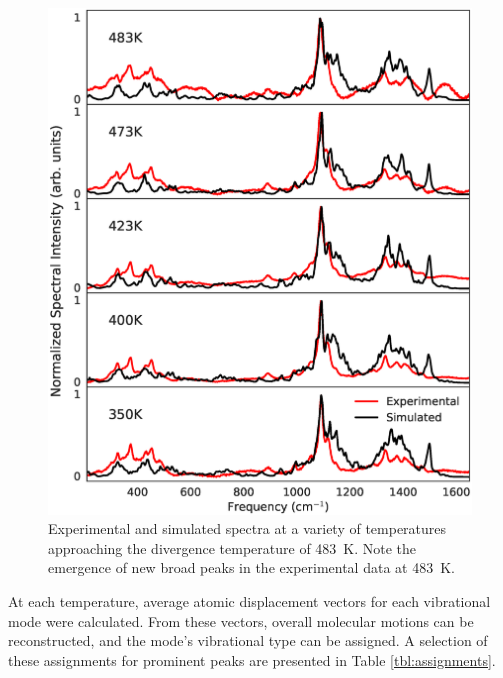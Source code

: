 \begin{figure}
\centering
\includegraphics[width=\linewidth]{money_graph_poster}
\caption{Experimental and simulated spectra at a variety of temperatures approaching the divergence temperature of \SI{483}{K}. Note the emergence of new broad peaks in the experimental data at \SI{483}{K}.}
\label{fig:money_graph_poster}
\end{figure}

At each temperature, average atomic displacement vectors for each vibrational mode were calculated. From these vectors, overall molecular motions can be reconstructed, and the mode's vibrational type can be assigned. A selection of these assignments for prominent peaks are presented in Table \ref{tbl:assignments}.

